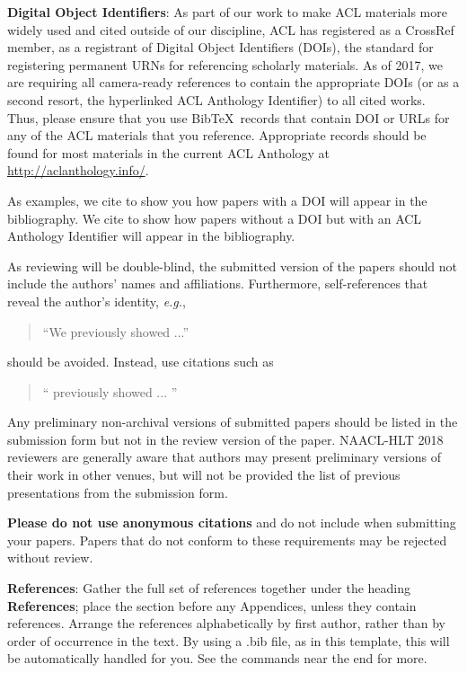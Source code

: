 \textbf{Digital Object Identifiers}:  As part of our work to make ACL
materials more widely used and cited outside of our discipline, ACL
has registered as a CrossRef member, as a registrant of Digital Object
Identifiers (DOIs), the standard for registering permanent URNs for
referencing scholarly materials.  As of 2017, we are requiring all
camera-ready references to contain the appropriate DOIs (or as a
second resort, the hyperlinked ACL Anthology Identifier) to all cited
works.  Thus, please ensure that you use Bib\TeX\ records that contain
DOI or URLs for any of the ACL materials that you reference.
Appropriate records should be found for most materials in the current
ACL Anthology at \url{http://aclanthology.info/}.

As examples, we cite \cite{P16-1001} to show you how papers with a DOI
will appear in the bibliography.  We cite \cite{C14-1001} to show how
papers without a DOI but with an ACL Anthology Identifier will appear
in the bibliography.  

As reviewing will be double-blind, the submitted version of the papers
should not include the authors' names and affiliations. Furthermore,
self-references that reveal the author's identity, {\em e.g.},
\begin{quote}
``We previously showed \cite{Gusfield:97} ...''  
\end{quote}
should be avoided. Instead, use citations such as 
\begin{quote}
``\citeauthor{Gusfield:97} 
previously showed ... ''
\end{quote}

Any preliminary non-archival versions of submitted papers should be listed in the submission form but not in the review version of the paper. NAACL-HLT 2018 reviewers are generally aware that authors may present preliminary versions of their work in other venues, but will not be provided the list of previous presentations from the submission form. 


\textbf{Please do not use anonymous citations} and do not include
 when submitting your papers. Papers that do not
conform to these requirements may be rejected without review.

\textbf{References}: Gather the full set of references together under
the heading {\bf References}; place the section before any Appendices,
unless they contain references. Arrange the references alphabetically
by first author, rather than by order of occurrence in the text.
By using a .bib file, as in this template, this will be automatically 
handled for you. See the \verb|| commands near the end for more.

